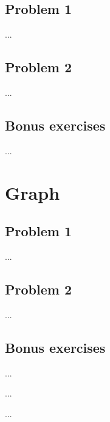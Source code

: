 \documentclass[a4paper]{article}
\begin{document}
	\subsection{Problem 1}
	...
	
	\subsection{Problem 2}
	...

	\subsection{Bonus exercises}
	...



\section{Graph}
	\subsection{Problem 1}
	...
	
	\subsection{Problem 2}
	...

	\subsection{Bonus exercises}
	...

\begin{thebibliography}{80}


...


...


\end{thebibliography}
\end{document}
